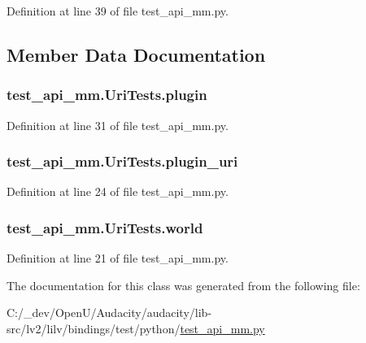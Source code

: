 Definition at line 39 of file test\+\_\+api\+\_\+mm.\+py.



\subsection{Member Data Documentation}
\subsubsection[{\texorpdfstring{plugin}{plugin}}]{\setlength{\rightskip}{0pt plus 5cm}test\+\_\+api\+\_\+mm.\+Uri\+Tests.\+plugin}\hypertarget{classtest__api__mm_1_1_uri_tests_ac2deac5574169aaa5300ae8f8cabc9cc}{}\label{classtest__api__mm_1_1_uri_tests_ac2deac5574169aaa5300ae8f8cabc9cc}


Definition at line 31 of file test\+\_\+api\+\_\+mm.\+py.

\subsubsection[{\texorpdfstring{plugin\+\_\+uri}{plugin_uri}}]{\setlength{\rightskip}{0pt plus 5cm}test\+\_\+api\+\_\+mm.\+Uri\+Tests.\+plugin\+\_\+uri}\hypertarget{classtest__api__mm_1_1_uri_tests_a62cfb1d284051d3de976cac021e28f0c}{}\label{classtest__api__mm_1_1_uri_tests_a62cfb1d284051d3de976cac021e28f0c}


Definition at line 24 of file test\+\_\+api\+\_\+mm.\+py.

\subsubsection[{\texorpdfstring{world}{world}}]{\setlength{\rightskip}{0pt plus 5cm}test\+\_\+api\+\_\+mm.\+Uri\+Tests.\+world}\hypertarget{classtest__api__mm_1_1_uri_tests_a44c0154929af0df42fd1d4d18415de97}{}\label{classtest__api__mm_1_1_uri_tests_a44c0154929af0df42fd1d4d18415de97}


Definition at line 21 of file test\+\_\+api\+\_\+mm.\+py.



The documentation for this class was generated from the following file\+:\begin{DoxyCompactItemize}
\item 
C\+:/\+\_\+dev/\+Open\+U/\+Audacity/audacity/lib-\/src/lv2/lilv/bindings/test/python/\hyperlink{test__api__mm_8py}{test\+\_\+api\+\_\+mm.\+py}\end{DoxyCompactItemize}
